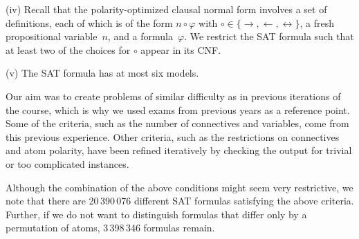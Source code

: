 \noindent(iv)
        Recall that the polarity-optimized clausal normal form involves a set of definitions,
        each of which is of the form
        $n \circ \varphi$ with $\circ \in \{ \rightarrow, \leftarrow, \leftrightarrow \}$,
        a fresh propositional variable~$n$, and a formula~$\varphi$.
        We restrict the SAT formula such that at least two of the choices for
        $\circ$ appear in its CNF.\smallskip

\noindent(v)
        The SAT formula has at most six models.
        \smallskip


Our aim was to create problems of similar difficulty as in previous iterations of the course,
which is why we used exams from previous years as a reference point.
Some of the criteria, such as the number of connectives and variables,
come from this previous experience.
Other criteria, such as the restrictions on connectives and atom polarity,
have been refined iteratively by checking the output for trivial or too complicated instances.

Although the combination of the above conditions might seem very restrictive,
we note that 
there are 20\,390\,076 different SAT formulas satisfying the above
criteria.
Further,
if we do not want to distinguish formulas that differ only by a permutation of atoms,
3\,398\,346 formulas remain.

